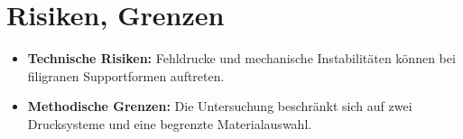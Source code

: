 \chapter{Risiken, Grenzen} %
\label{cha:Risiken, Grenzen} %

\begin{itemize}
  \item \textbf{Technische Risiken:} Fehldrucke und mechanische Instabilitäten können bei filigranen Supportformen auftreten.  
  \item \textbf{Methodische Grenzen:} Die Untersuchung beschränkt sich auf zwei Drucksysteme und eine begrenzte Materialauswahl.  
\end{itemize}
